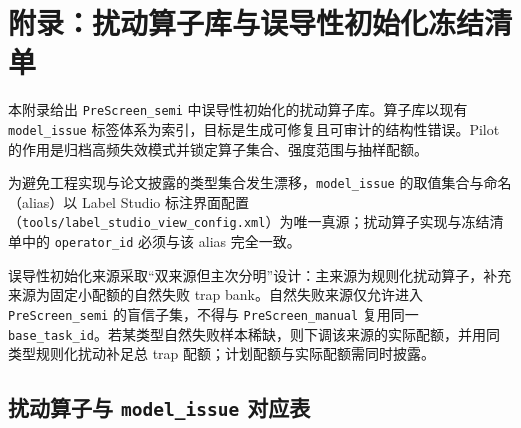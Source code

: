 \section{附录：扰动算子库与误导性初始化冻结清单}\label{app:perturbation-library}

本附录给出 \texttt{PreScreen\_semi} 中误导性初始化的扰动算子库。算子库以现有 \texttt{model\_issue} 标签体系为索引，目标是生成可修复且可审计的结构性错误。Pilot 的作用是归档高频失效模式并锁定算子集合、强度范围与抽样配额。

为避免工程实现与论文披露的类型集合发生漂移，\texttt{model\_issue} 的取值集合与命名（alias）以 Label Studio 标注界面配置（\texttt{tools/label\_studio\_view\_config.xml}）为唯一真源；扰动算子实现与冻结清单中的 \texttt{operator\_id} 必须与该 alias 完全一致。

误导性初始化来源采取“双来源但主次分明”设计：主来源为规则化扰动算子，补充来源为固定小配额的自然失败 trap bank。自然失败来源仅允许进入 \texttt{PreScreen\_semi} 的盲信子集，不得与 \texttt{PreScreen\_manual} 复用同一 \texttt{base\_task\_id}。若某类型自然失败样本稀缺，则下调该来源的实际配额，并用同类型规则化扰动补足总 trap 配额；计划配额与实际配额需同时披露。

\subsection{扰动算子与 \texttt{model\_issue} 对应表}\label{app:perturbation-operators}

